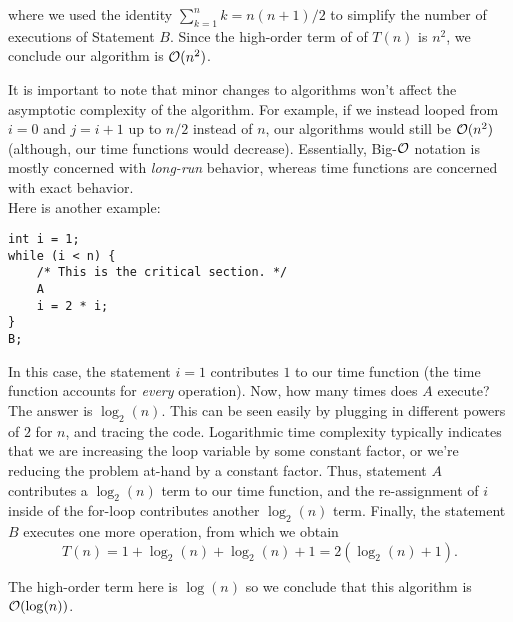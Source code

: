\noindent where we used the identity $\sum_{k=1}^{n} k = n(n + 1)/2$ to simplify the number of executions of Statement $B$. Since the high-order term of of $T(n)$ is $n^2$, we conclude our algorithm is $\mathcal{O}(n^{2})$. 

\noindent It is important to note that minor changes to algorithms won't affect the asymptotic complexity of the algorithm. For example, if we instead looped from $i = 0$ and $j = i + 1$ up to $n/2$ instead of $n$, our algorithms would still be $\mathcal{O}(n^2)$ (although, our time functions would decrease). Essentially, Big-$\mathcal{O}$ notation is mostly concerned with \textit{long-run} behavior, whereas time functions are concerned with exact behavior. \\

Here is another example:

\begin{lstlisting}
int i = 1;
while (i < n) {
    /* This is the critical section. */
    A
    i = 2 * i;
}
B;
\end{lstlisting}

\noindent In this case, the statement $i = 1$ contributes $1$ to our time function (the time function accounts for \textit{every} operation). Now, how many times does $A$ execute? The answer is $\log_{2}(n)$. This can be seen easily by plugging in different powers of $2$ for $n$, and tracing the code. Logarithmic time complexity typically indicates that we are increasing the loop variable by some constant factor, or we're reducing the problem at-hand by a constant factor. Thus, statement $A$ contributes a $\log_2(n)$ term to our time function, and the re-assignment of $i$ inside of the for-loop contributes another $\log_2(n)$ term. Finally, the statement $B$ executes one more operation, from which we obtain
\[
T(n) = 1 + \log_2(n) + \log_2(n) + 1 = 2(\log_2(n) + 1).
\]

\noindent The high-order term here is $\log(n)$ so we conclude that this algorithm is $\mathcal{O}(\log(n))$. \\

